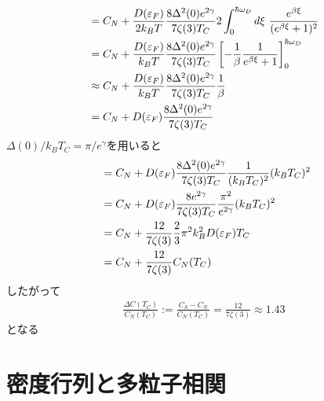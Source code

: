 \documentclass[dvipdfmx, 11pt, a4paper]{jsarticle}
\numberwithin{equation}{section}
\theoremstyle{definition}
\begin{document}
\begin{derivationBox}
\begin{align}
            &= C_N + \frac{D(\varepsilon_F)}{2k_BT}\frac{8\Delta^2(0)e^{2\gamma}}{7\zeta(3)T_C} 2\int_0^{ \hbar \omega_D} d\xi\  \frac{e^{\beta \xi}}{(e^{\beta \xi}+1)^2} \notag \\
            &= C_N + \frac{D(\varepsilon_F)}{k_BT}\frac{8\Delta^2(0)e^{2\gamma}}{7\zeta(3)T_C} \left[  -\frac{1}{\beta} \frac{1}{e^{\beta \xi}+1} \right]_0^{\hbar\omega_D} \notag \\
            &\approx C_N + \frac{D(\varepsilon_F)}{k_BT}\frac{8\Delta^2(0)e^{2\gamma}}{7\zeta(3)T_C} \frac{1}{\beta} \notag \\
            &= C_N + D(\varepsilon_F)\frac{8\Delta^2(0)e^{2\gamma}}{7\zeta(3)T_C}  
        \end{align}
        $\Delta(0)/k_BT_C = \pi / e^\gamma $を用いると
        \begin{align}
            &= C_N + D(\varepsilon_F)\frac{8\Delta^2(0)e^{2\gamma}}{7\zeta(3)T_C}  \frac{1}{(k_BT_C)^2}(k_BT_C)^2 \notag \\
            &= C_N + D(\varepsilon_F)\frac{8e^{2\gamma}}{7\zeta(3)T_C} \frac{\pi^2}{e^{2\gamma}} (k_BT_C)^2 \notag \\
            &= C_N + \frac{12}{7\zeta(3)} \frac{2}{3} \pi^2 k_B^2 D(\varepsilon_F) T_C \notag \\\
            &= C_N + \frac{12}{7\zeta(3)} C_N(T_C)
        \end{align}
        したがって
        \begin{align}
            \frac{\Delta C(T_C)}{C_N(T_C)} := \frac{C_S - C_N}{C_N(T_C)} = \frac{12}{7\zeta(3)} \approx 1.43
        \end{align}
        となる
    \end{derivationBox}

\appendix
\renewcommand{\thesection}{付録\Alph{section}}

\renewcommand{\theequation}{\Alph{section}.\arabic{equation}}
\setcounter{equation}{0} %

\section{密度行列と多粒子相関}
\end{document}
